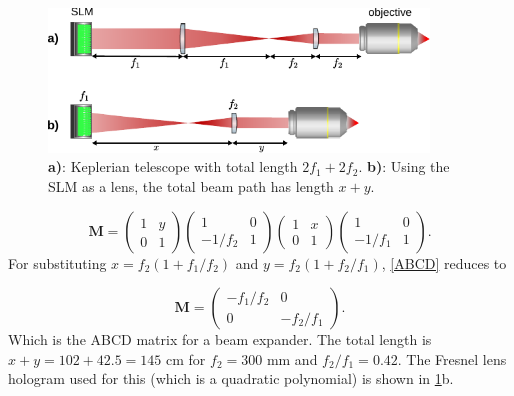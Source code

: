 \begin{figure}
	\centering
	\includegraphics[width=0.9\textwidth]{figures/beamPathSLM.pdf}
	\caption{\textbf{a)}: Keplerian telescope with total length $2f_1+2f_2$. \textbf{b)}: Using the SLM as a lens, the total beam path has length $x+y$.}
	\label{fig:SLMbeampath}
\end{figure}

\begin{equation}\label{ABCD}
	\mathbf{M}=
	\begin{pmatrix}
		1 & y \\
		0 & 1
	\end{pmatrix}
	\begin{pmatrix}
		1 & 0 \\
		-1/f_2 & 1
	\end{pmatrix}
	\begin{pmatrix}
		1 & x \\
		0 & 1
	\end{pmatrix}
	\begin{pmatrix}
		1 & 0 \\
		-1/f_1 & 1
	\end{pmatrix}.
\end{equation}
For substituting $x= f_2(1+f_1/f_2)$ and $y=f_2(1+f_2/f_1)$, \cref{ABCD} reduces to

\begin{equation}
	\mathbf{M}=
	\begin{pmatrix}
		-f_1/f_2 & 0\\
		0 & -f_2/f_1
	\end{pmatrix}.
\end{equation}
Which is the ABCD matrix for a beam expander. The total length is $x+y = 102 + 42.5 = 145$ cm for $f_2 = 300$ mm and $f_2/f_1=0.42$.
The Fresnel lens hologram used for this (which is a quadratic polynomial) is shown in \ref{fig:SLMbeampath}b.

